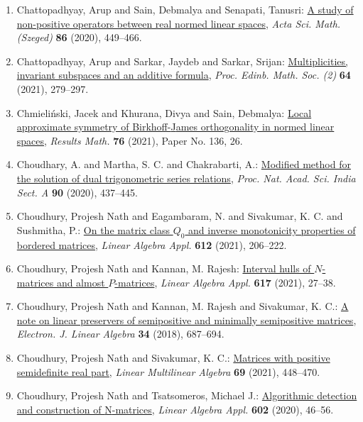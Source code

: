 \begin{enumerate}
{difference equation}, \emph{Discrete Contin. Dyn. Syst.} {\bf 38} (2018), 1707--1718.
\item Chattopadhyay, Arup and Sain, Debmalya and Senapati, Tanusri: \href{https://doi.org/10.14232/actasm-019-554-z}{A study of non-positive operators between real normed linear
spaces}, \emph{Acta Sci. Math. (Szeged)} {\bf 86} (2020), 449--466.
\item Chattopadhyay, Arup and Sarkar, Jaydeb and Sarkar, Srijan: \href{https://doi.org/10.1017/S0013091521000146}{Multiplicities, invariant subspaces and an additive formula}, \emph{Proc. Edinb. Math. Soc. (2)} {\bf 64} (2021), 279--297.
\item Chmieli\'{n}ski, Jacek and Khurana, Divya and Sain, Debmalya: \href{https://doi.org/10.1007/s00025-021-01437-y}{Local approximate symmetry of {B}irkhoff-{J}ames orthogonality
in normed linear spaces}, \emph{Results Math.} {\bf 76} (2021), Paper No. 136, 26.
\item Choudhary, A. and Martha, S. C. and Chakrabarti, A.: \href{https://doi.org/10.1007/s40010-019-00600-z}{Modified method for the solution of dual trigonometric series
relations}, \emph{Proc. Nat. Acad. Sci. India Sect. A} {\bf 90} (2020), 437--445.
\item Choudhury, Projesh Nath and Eagambaram, N. and Sivakumar, K.
C. and Sushmitha, P.: \href{https://doi.org/10.1016/j.laa.2020.10.041}{On the matrix class {$Q_0$} and inverse monotonicity
properties of bordered matrices}, \emph{Linear Algebra Appl.} {\bf 612} (2021), 206--222.
\item Choudhury, Projesh Nath and Kannan, M. Rajesh: \href{https://doi.org/10.1016/j.laa.2021.01.005}{Interval hulls of {$N$}-matrices and almost {$P$}-matrices}, \emph{Linear Algebra Appl.} {\bf 617} (2021), 27--38.
\item Choudhury, Projesh Nath and Kannan, M. Rajesh and Sivakumar,
K. C.: \href{https://doi.org/10.13001/1081-3810.3864}{A note on linear preservers of semipositive and minimally
semipositive matrices}, \emph{Electron. J. Linear Algebra} {\bf 34} (2018), 687--694.
\item Choudhury, Projesh Nath and Sivakumar, K. C.: \href{https://doi.org/10.1080/03081087.2019.1602588}{Matrices with positive semidefinite real part}, \emph{Linear Multilinear Algebra} {\bf 69} (2021), 448--470.
\item Choudhury, Projesh Nath and Tsatsomeros, Michael J.: \href{https://doi.org/10.1016/j.laa.2020.04.028}{Algorithmic detection and construction of {N}-matrices}, \emph{Linear Algebra Appl.} {\bf 602} (2020), 46--56.

\end{enumerate}
